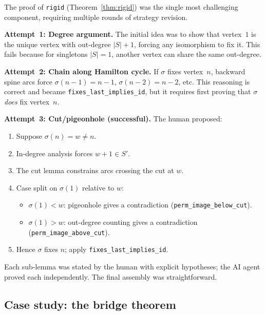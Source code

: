 \begin{humanparagraph}
The proof of \texttt{rigid} (Theorem~\ref{thm:rigid}) was the single most
challenging component, requiring multiple rounds of strategy revision.

\medskip
\noindent\textbf{Attempt~1: Degree argument.}
The initial idea was to show that vertex~$1$ is the unique vertex with
out-degree $|S| + 1$, forcing any isomorphism to fix it. This fails because
for singletons $|S| = 1$, another vertex can share the same out-degree.

\medskip
\noindent\textbf{Attempt~2: Chain along Hamilton cycle.}
If $\sigma$ fixes vertex~$n$, backward spine arcs force
$\sigma(n{-}1) = n{-}1$, $\sigma(n{-}2) = n{-}2$, etc. This reasoning is
correct and became \texttt{fixes\_last\_implies\_id}, but it requires first
proving that $\sigma$ \emph{does} fix vertex~$n$.

\medskip
\noindent\textbf{Attempt~3: Cut/pigeonhole (successful).}
The human proposed:
\begin{enumerate}
\item Suppose $\sigma(n) = w \neq n$.
\item In-degree analysis forces $w + 1 \in S'$.
\item The cut lemma constrains arcs crossing the cut at $w$.
\item Case split on $\sigma(1)$ relative to $w$:
  \begin{itemize}
  \item $\sigma(1) < w$: pigeonhole gives a contradiction
    (\texttt{perm\_image\_below\_cut}).
  \item $\sigma(1) > w$: out-degree counting gives a contradiction
    (\texttt{perm\_image\_above\_cut}).
  \end{itemize}
\item Hence $\sigma$ fixes $n$; apply \texttt{fixes\_last\_implies\_id}.
\end{enumerate}
Each sub-lemma was stated by the human with explicit hypotheses; the AI agent
proved each independently. The final assembly was straightforward.
\end{humanparagraph}

\subsection{Case study: the bridge theorem}

